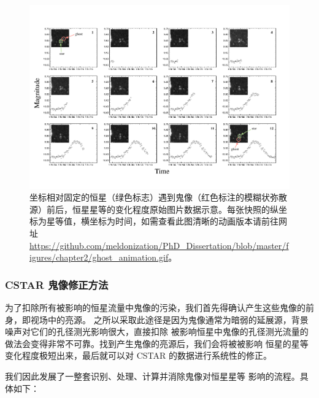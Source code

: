 \begin{figure}
\centering
\includegraphics[scale=0.8]{figures/chapter2/f5_ghostseq.pdf}
\caption[坐标相对固定的恒星（绿色标志）遇到鬼像（红色标注的模糊状弥散源）前后，恒星星等的变化程度原始图片数据示意。]{坐标相对固定的恒星（绿色标志）遇到鬼像（红色标注的模糊状弥散源）前后，恒星星等的变化程度原始图片数据示意。每张快照的纵坐标为星等值，横坐标为时间，如需查看此图清晰的动画版本请前往网址 \url{https://github.com/meldonization/PhD_Dissertation/blob/master/figures/chapter2/ghost_animation.gif}。}
\label{fig:ghostseq}
\end{figure}


\subsubsection{CSTAR 鬼像修正方法}

为了扣除所有被影响的恒星流量中鬼像的污染，我们首先得确认产生这些鬼像的前身，即视场中的亮源。
之所以采取此途径是因为鬼像通常为暗弱的延展源，背景噪声对它们的孔径测光影响很大，直接扣除
被影响恒星中鬼像的孔径测光流量的做法会变得非常不可靠。找到产生鬼像的亮源后，我们会将被被影响
恒星的星等变化程度极短出来，最后就可以对 CSTAR 的数据进行系统性的修正。

我们因此发展了一整套识别、处理、计算并消除鬼像对恒星星等	影响的流程。具体如下：

